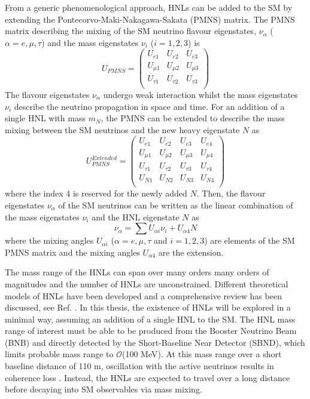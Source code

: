 From a generic phenomenological approach, HNLs can be added to the SM by extending the Pontecorvo-Maki-Nakagawa-Sakata (PMNS) matrix.
The PMNS matrix describing the mixing of the SM neutrino flavour eigenstates, $\nu_{\alpha}$ ($\alpha=e,\mu,\tau$) and the mass eigenstates $\nu_{i}$ ($i=1,2,3$) is 
\begin{equation}
	U_{PMNS} =
	\begin{pmatrix}
		U_{e1} & U_{e2} & U_{e3}\\
		U_{\mu1} & U_{\mu2} & U_{\mu3}\\
		U_{\tau1} & U_{\tau2} & U_{\tau3}\\
	\end{pmatrix}
\end{equation}
The flavour eigenstates $\nu_{\alpha}$ undergo weak interaction whilst the mass eigenstates $\nu_{i}$ describe the neutrino propagation in space and time.
For an addition of a single HNL with mass $m_{N}$, the PMNS can be extended to describe the mass mixing between the SM neutrinos and the new heavy eigenstate $N$ as 
\begin{equation}
	U_{PMNS}^{Extended} =
	\begin{pmatrix}
		U_{e1} & U_{e2} & U_{e3} & U_{e4}\\
		U_{\mu1} & U_{\mu2} & U_{\mu3} & U_{\mu4}\\
		U_{\tau1} & U_{\tau2} & U_{\tau3} & U_{\tau4}\\
		U_{N1} & U_{N2} & U_{N3} & U_{N4}\\
	\end{pmatrix}
\end{equation}
where the index 4 is reserved for the newly added $N$.
Then, the flavour eigenstates  $\nu_{\alpha}$ of the SM neutrinos can be written as the linear combination of the mass eigenstates $\nu_{i}$ and the HNL eigenstate $N$ as  
\begin{equation}
	\nu_{\alpha}=\sum U_{\alpha i}\nu_{i} + U_{\alpha 4}N
\end{equation}
where the mixing angles $U_{\alpha i }$ ($\alpha=e,\mu,\tau$ and $i=1,2,3$) are elements of the SM PMNS matrix and the mixing angles $U_{\alpha 4}$ are the extension.

The mass range of the HNLs can span over many orders many orders of magnitudes and the number of HNLs are unconstrained.
Different theoretical models of HNLs have been developed and a comprehensive review has been discussed, see Ref. \cite{HNLWhitePaper}. 
In this thesis, the existence of HNLs will be explored in a minimal way, assuming an addition of a single HNL to the SM.  
The HNL mass range of interest must be able to be produced from the Booster Neutrino Beam (BNB) and directly detected by the Short-Baseline Near Detector (SBND), which limits probable mass range to $\mathcal{O}$(100 MeV).
At this mass range over a short baseline distance of 110 m, oscillation with the active neutrinos results in coherence loss \cite{SBNHNL}.
Instead, the HNLs are expected to travel over a long distance before decaying into SM observables via mass mixing.

